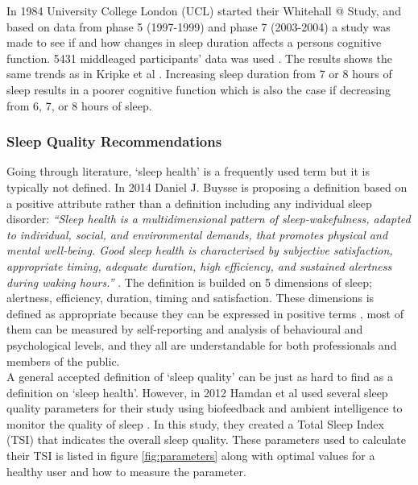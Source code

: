 \documentclass[12pt]{article} %
\makeatletter
\newcommand*{\rom}[1]{\expandafter\@slowromancap\romannumeral #1@}
\makeatother
\begin{document}
In 1984 University College London (UCL) started their Whitehall \rom{2} Study, and based on data from phase 5 (1997-1999) and phase 7 (2003-2004) a study was made to see if and how changes in sleep duration affects a persons cognitive function. 5431 middleaged participants' data was used \cite{cognitive}. The results shows the same trends as in Kripke et al \cite{arch}. Increasing sleep duration from 7 or 8 hours of sleep results in a poorer cognitive function which is also the case if decreasing from 6, 7, or 8 hours of sleep. 

\subsubsection{Sleep Quality Recommendations}
Going through literature, `sleep health' is a frequently used term but it is typically not defined. In 2014 Daniel J. Buysse is proposing a definition based on a positive attribute rather than a definition including any individual sleep disorder:
\textit{``Sleep health is a multidimensional pattern of sleep-wakefulness, adapted to individual, social, and environmental demands, that promotes physical and mental well-being. Good sleep health is characterised by subjective satisfaction, appropriate timing, adequate duration, high efficiency, and sustained alertness during waking hours.''} \cite{define}. 
The definition is builded on 5 dimensions of sleep; alertness, efficiency, duration, timing and satisfaction. These dimensions is defined as appropriate because they can be expressed in positive terms , most of them can be measured by self-reporting and analysis of behavioural and psychological levels, and they all are understandable for both professionals and members of the public. \\

A general accepted definition of `sleep quality' can be just as hard to find as a definition on `sleep health'. However, in 2012 Hamdan et al used several sleep quality parameters for their study using biofeedback and ambient intelligence to monitor the quality of sleep \cite{Hamdan2012ABS}. In this study, they created a Total Sleep Index (TSI) that indicates the overall sleep quality. These parameters used to calculate their TSI is listed in figure \ref{fig:parameters} along with optimal values for a healthy user and how to measure the parameter. 
\end{document}
